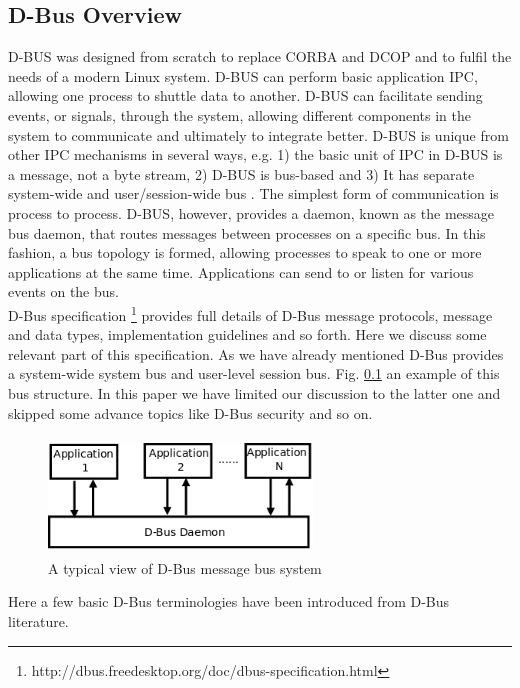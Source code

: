 \documentclass{ifacconf}
\begin{document}
\subsection{D-Bus Overview}
D-BUS was designed from scratch to replace CORBA and DCOP and to fulfil the needs of a modern Linux system. D-BUS can perform basic application IPC, allowing one process to shuttle data to another. D-BUS can facilitate sending events, or signals, through the system, allowing different components in the system to communicate and ultimately to integrate better. D-BUS is unique from other IPC mechanisms in several ways, e.g. 1) the basic unit of IPC in D-BUS is a message, not a byte stream, 2) D-BUS is bus-based and 3) It has separate system-wide and user/session-wide bus  \cite{Love2006} . The simplest form of communication is process to process. D-BUS, however, provides a daemon, known as the message bus daemon, that routes messages between processes on a specific bus. In this fashion, a bus topology is formed, allowing processes to speak to one or more applications at the same time. Applications can send to or listen for various events on the bus.\\
D-Bus specification \footnote{http://dbus.freedesktop.org/doc/dbus-specification.html} provides full details of D-Bus message protocols, message and data types, implementation guidelines and so forth. Here we discuss some relevant part  of this specification.  As we have already mentioned D-Bus provides a system-wide system bus and user-level session bus. Fig. \ref{} an example of this bus structure. In this paper we have limited our discussion to the latter one and skipped some advance topics like D-Bus security and so on.
\begin{figure}
\begin{center}
\includegraphics[width=7cm,height=3.1cm]{./dia-files/dbus-daemon}    %
\caption{A typical view of D-Bus message bus system } 
\label{fig:abstract-arch}
\end{center}
\end{figure}
Here a few basic D-Bus terminologies have been   introduced from D-Bus literature.\\
\end{document}

